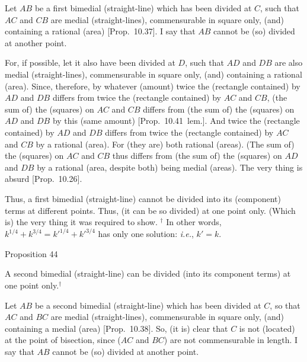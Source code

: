 \epsfysize=0.3in
\centerline{}

Let $AB$ be a first bimedial (straight-line) which has been divided at $C$, such
that $AC$ and $CB$ are medial (straight-lines), commensurable
in square only, (and) containing a rational (area) [Prop.~10.37].  I say that $AB$ cannot be (so) divided
at another point.

For, if possible, let it also have been divided at $D$, such that $AD$ and
$DB$ are also medial (straight-lines), commensurable in square only, (and)
containing a rational (area). Since, therefore, by whatever (amount) twice the
(rectangle contained) by $AD$ and $DB$ differs from twice the (rectangle
contained) by $AC$ and $CB$, (the sum of) the (squares)
on $AC$ and $CB$ differs from (the sum of) the (squares) on $AD$ and
$DB$ by this (same amount) [Prop.~10.41~lem.]. And twice the (rectangle
contained) by  $AD$ and $DB$ differs from twice the (rectangle contained)
by $AC$ and $CB$ by a rational (area). For (they are) both
rational (areas). (The sum of) the (squares) on $AC$ and $CB$
thus differs from (the sum of) the (squares) on $AD$ and $DB$ by a
rational (area, despite both) being medial (areas). The very thing is
absurd [Prop.~10.26].

Thus,  a first bimedial (straight-line) cannot be divided into its (component)
terms at different points. Thus, (it can be so divided) at one
point only.
(Which is) the very thing it was required to show.
{\footnotesize\noindent$^\dag$ In other words, $k^{1/4} + k^{3/4} = k'^{1/4} + k'^{3/4}$
has only one solution: {\em i.e.}, $k'=k$.} 



\begin{center}
{\large Proposition 44}
\end{center}

A second bimedial (straight-line)  can be divided
(into its component terms)
at one point only.$^\dag$

Let $AB$ be a second bimedial (straight-line) which has  been divided at $C$, so that $AC$ and $BC$ are medial (straight-lines), commensurable in square
only, (and) containing a medial (area) [Prop.~10.38].
So, (it is) clear that $C$ is not 
(located) at the point of bisection, since ($AC$ and $BC$)
are not commensurable in length. I say that $AB$ cannot be (so) divided at another point.

\epsfysize=1.5in
\centerline{}


